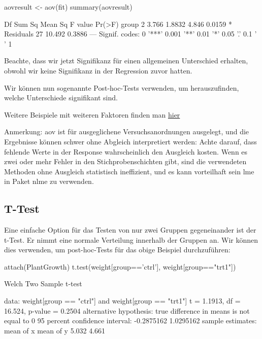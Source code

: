 \documentclass[a4paper,twoside]{tufte-book}\usepackage[]{graphicx}\usepackage[]{color}
\begin{document}
\begin{appendices}
\begin{Schunk}
\begin{Sinput}
aovresult <- aov(fit)
summary(aovresult)
\end{Sinput}
\begin{Soutput}
            Df Sum Sq Mean Sq F value Pr(>F)  
group        2  3.766  1.8832   4.846 0.0159 *
Residuals   27 10.492  0.3886                 
---
Signif. codes:  0 '***' 0.001 '**' 0.01 '*' 0.05 '.' 0.1 ' ' 1
\end{Soutput}
\end{Schunk}

Beachte, dass wir jetzt Signifikanz für einen allgemeinen Unterschied erhalten, obwohl wir keine Signifikanz in der Regression zuvor hatten.

Wir können nun sogenannte Post-hoc-Tests verwenden, um herauszufinden, welche Unterschiede signifikant sind.

Weitere Beispiele mit weiteren Faktoren finden man \href{http://www.statmethods.net/stats/anova.html}{hier} 


Anmerkung: aov ist für ausgeglichene Versuchsanordnungen ausgelegt, und die Ergebnisse können schwer ohne Abgleich interpretiert werden: Achte darauf, dass fehlende Werte in der Response wahrscheinlich den Ausgleich kosten. Wenn es zwei oder mehr Fehler in den Stichprobenschichten gibt, sind die verwendeten Methoden ohne Ausgleich statistisch ineffizient, und es kann vorteilhaft sein lme in Paket nlme zu verwenden.

\subsection{T-Test}

Eine einfache Option für das Testen von nur zwei Gruppen gegeneinander ist der t-Test. Er nimmt eine normale Verteilung innerhalb der Gruppen an. Wir können dies verwenden, um post-hoc-Tests für das obige Beispiel durchzuführen:

\begin{Schunk}
\begin{Sinput}
attach(PlantGrowth)
t.test(weight[group=='ctrl'], weight[group=="trt1"])
\end{Sinput}
\begin{Soutput}

	Welch Two Sample t-test

data:  weight[group == "ctrl"] and weight[group == "trt1"]
t = 1.1913, df = 16.524, p-value = 0.2504
alternative hypothesis: true difference in means is not equal to 0
95 percent confidence interval:
 -0.2875162  1.0295162
sample estimates:
mean of x mean of y 
    5.032     4.661 
\end{Soutput}
\end{Schunk}


\end{appendices}
\end{document}
